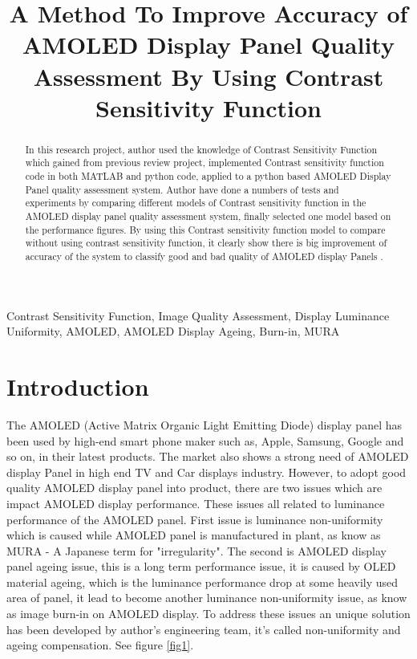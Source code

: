 \documentclass{article}
\title{A Method To Improve Accuracy of AMOLED Display Panel Quality Assessment By Using Contrast Sensitivity Function}
\begin{document}
\maketitle{}
%
\begin{abstract}
%
In this research project, author used the knowledge of Contrast Sensitivity Function which gained from previous review project, implemented Contrast sensitivity function code in both MATLAB and python code, applied to a python based AMOLED Display Panel quality assessment system. Author have done a numbers of tests and experiments by comparing different models of Contrast sensitivity function in the AMOLED display panel quality assessment system, finally selected one model based on the performance figures. By using this Contrast sensitivity function model to compare without using contrast sensitivity function, it clearly show there is big improvement of accuracy of the system to classify good and bad quality of AMOLED display Panels .   
\end{abstract}

\begin{keywords}
Contrast Sensitivity Function, Image Quality Assessment, Display Luminance Uniformity, AMOLED, AMOLED Display Ageing, Burn-in, MURA
\end{keywords}
%

\section{Introduction}
The AMOLED (Active Matrix Organic Light Emitting Diode) display panel has been used by high-end smart phone maker such as, Apple, Samsung, Google and so on, in their latest products. The market also shows a strong need of AMOLED display Panel in high end TV and Car displays industry. However, to adopt good quality AMOLED display panel into product, there are two issues which are impact AMOLED display performance. These issues all related to luminance performance of the AMOLED panel. First issue is luminance non-uniformity which is caused while AMOLED panel is manufactured in plant, as know as MURA - A Japanese term for "irregularity". The second is AMOLED display panel ageing issue, this is a long term performance issue, it is caused by OLED material ageing, which is the luminance performance drop at some heavily used area of panel, it lead to become another luminance non-uniformity issue, as know as image burn-in on AMOLED display. 
To address these issues an unique solution has been developed by author's engineering team, it's called non-uniformity and ageing compensation. See figure \ref{fig1}. \\
\end{document}
